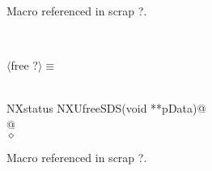 \documentclass[12pt]{article}
\begin{document}
{\begin{flushleft}
\begin{minipage}{\linewidth}
\begin{list}{}{}
\mbox{}\verb@        return NX_ERROR;@\\
\mbox{}\verb@      }@\\
\mbox{}\verb@      return NX_OK;@\\
\mbox{}\verb@   }@\\
\mbox{}\verb@@$\diamond$
\end{list}
\vspace{-1ex}
\footnotesize\addtolength{\baselineskip}{-1ex}
\begin{list}{}{\setlength{\itemsep}{-\parsep}\setlength{\itemindent}{-\leftmargin}}
\item Macro referenced in scrap ?.
\end{list}
\end{minipage}\\[4ex]
\end{flushleft}
\begin{flushleft} \small
\begin{minipage}{\linewidth} \label{scrap40}
$\langle$free {\footnotesize ?}$\rangle\equiv$
\vspace{-1ex}
\begin{list}{}{} \item
\mbox{}\verb@@\\
\mbox{}\verb@   NXstatus NXUfreeSDS(void **pData)@\\
\mbox{}@\\
\mbox{}\verb@@$\diamond$
\end{list}
\vspace{-1ex}
\footnotesize\addtolength{\baselineskip}{-1ex}
\begin{list}{}{\setlength{\itemsep}{-\parsep}\setlength{\itemindent}{-\leftmargin}}
\item Macro referenced in scrap ?.
\end{list}
\end{minipage}\\[4ex]
\end{flushleft}
}
\end{document}
